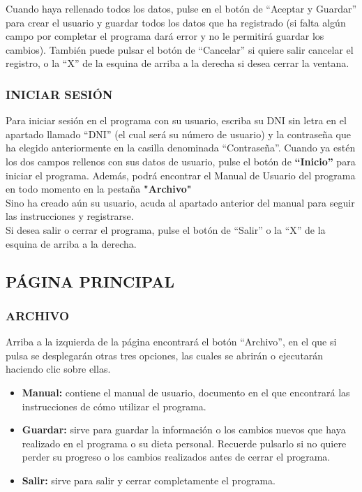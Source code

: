 Cuando haya rellenado todos los datos, pulse en el botón de “Aceptar y Guardar” para crear el usuario y guardar todos los datos que ha registrado (si falta algún campo por completar el programa dará error y no le permitirá guardar los cambios). También puede pulsar el botón de “Cancelar” si quiere salir cancelar el registro, o la “X” de la esquina de arriba a la derecha si desea cerrar la ventana.
\subsubsection{INICIAR SESIÓN}
Para iniciar sesión en el programa con su usuario, escriba su DNI sin letra en el apartado llamado “DNI” (el cual será su número de usuario) y la contraseña que ha elegido anteriormente en la casilla denominada “Contraseña”. Cuando ya estén los dos campos rellenos con sus datos de usuario, pulse el botón de \textbf{“Inicio”} para iniciar el programa. Además, podrá encontrar el Manual de Usuario del programa en todo momento en la pestaña \textbf{"Archivo"}\\
Sino ha creado aún su usuario, acuda al apartado anterior del manual para seguir las instrucciones y registrarse.\\
Si desea salir o cerrar el programa, pulse el botón de “Salir” o la “X” de la esquina de arriba a la derecha.
\subsection{PÁGINA PRINCIPAL}
\subsubsection{ARCHIVO}
Arriba a la izquierda de la página encontrará el botón “Archivo”, en el que si pulsa se desplegarán otras tres opciones, las cuales se abrirán o ejecutarán haciendo clic sobre ellas.
\begin{itemize}
\item	\textbf{Manual:} contiene el manual de usuario, documento en el que encontrará las instrucciones de cómo utilizar el programa.
\item	\textbf{Guardar:} sirve para guardar la información o los cambios nuevos que haya realizado en el programa o su dieta personal. Recuerde pulsarlo si no quiere perder su progreso o los cambios realizados antes de cerrar el programa.
\item	\textbf{Salir:} sirve para salir y cerrar completamente el programa.
\end{itemize}
